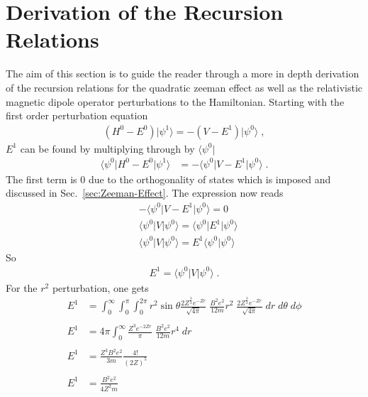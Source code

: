 \chapter{Derivation of the Recursion Relations}
    The aim of this section is to guide the reader through a more in depth derivation of the recursion relations for the quadratic zeeman effect as well as the relativistic magnetic dipole operator perturbations to the Hamiltonian. Starting with the first order perturbation equation
    \begin{align}
        \left(H^0 - E^0 \right) \vert \psi^1 \rangle = -\left( V - E^1  \right) \vert \psi^0 \rangle\;,
    \end{align}
    \noindent $E^1$ can be found by multiplying through by $\langle \psi^0 \vert$
    \begin{align}
        \langle \psi^0 \vert H^0 - E^0 \vert \psi^1 \rangle &= -\langle \psi^0 \vert V - E^1 \vert \psi^0 \rangle \;.
    \end{align}
    \noindent The first term is $0$ due to the orthogonality of states which is imposed and discussed in Sec.~\ref{sec:Zeeman-Effect}. The expression now reads 
    \begin{align*}
        &-\langle \psi^0 \vert V - E^1 \vert \psi^0 \rangle = 0 \\
        &\langle \psi^0 \vert V \vert \psi^0 \rangle =  \langle \psi^0 \vert E^1 \vert \psi^0 \rangle\\
        &\langle \psi^0 \vert V \vert \psi^0 \rangle =  E^1 \langle \psi^0 \vert \psi^0 \rangle
    \end{align*}
    \noindent So 
    \begin{align}
        E^1 = \langle \psi^0 \vert V \vert \psi^0 \rangle\;.
    \end{align}
    \noindent For the $r^2$ perturbation, one gets 
    \begin{align*}
        E^1 &= \int^\infty_0\int_0^\pi  \int_0^{2\pi} r^2 \sin\theta \frac{2Z^{\frac{3}{2}} e^{-Zr}}{\sqrt{4\pi}} \; \frac{B^2e^2}{12m}r^2\;  \frac{2Z^{\frac{3}{2}} e^{-Zr}}{\sqrt{4\pi}} \;dr\; d\theta\; d\phi\\ \nonumber\\
        E^1 &= {4\pi} \int_0^\infty \frac{Z^3 e^{-2Zr}}{\pi} \; \frac{B^2e^2}{12m}r^4 \;dr\\ \nonumber\\
        E^1 &= \frac{Z^3 B^2 e^2}{3m} \frac{4!}{(2Z)^5} \\ \nonumber \\
        E^1 &= \frac{B^2 e^2}{4Z^2m}
    \end{align*}
